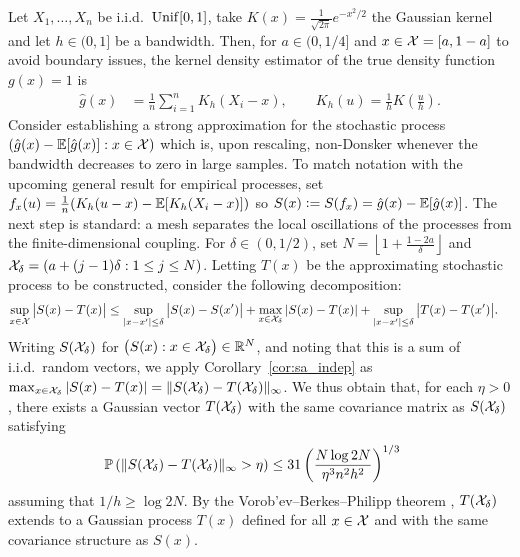 Let $X_1, \ldots, X_n$ be i.i.d.\ $\operatorname{Unif}[0,1]$, take
$K(x) = \frac{1}{\sqrt{2 \pi}} e^{-x^2/2}$ the Gaussian kernel and let
$h \in (0,1]$ be a bandwidth. Then, for $a \in (0,1/4]$ and
$x \in \mathcal{X} = [a, 1-a]$ to avoid boundary issues, the kernel density estimator
of the true density function $g(x) = 1$ is
%
\begin{align*}
  \hat g(x)
  &=
  \frac{1}{n}
  \sum_{i=1}^{n}
  K_h( X_i - x),
  \qquad K_h(u) = \frac{1}{h} K\left( \frac{u}{h} \right).
\end{align*}
%
Consider establishing a strong approximation for the stochastic process
$(\hat g(x)-\mathbb{E} [ \hat g(x) ] : x\in\mathcal{X})$
which is, upon rescaling, non-Donsker whenever
the bandwidth decreases to zero in large samples.
To match notation with the upcoming
general result for empirical processes, set
$f_x(u) = \frac{1}{n} (K_h( u - x) - \mathbb{E}[K_h( X_i - x)])$
so $S(x) \vcentcolon= S(f_x) = \hat g(x)-\mathbb{E} [ \hat g(x) ]$.
The next step is standard: a
mesh separates the local oscillations of the processes from
the finite-dimensional coupling. %
For $\delta \in (0,1/2)$, set
$N = \left\lfloor 1 + \frac{1 - 2a}{\delta} \right\rfloor$
and $\mathcal{X}_\delta = (a + (j-1)\delta : 1 \leq j \leq N)$.
Letting $T(x)$ be the approximating stochastic
process to be constructed, consider the following decomposition:
\begin{align*}
  \sup_{x \in \mathcal{X}}
  \big|S(x) - T(x)\big|
  &\leq
  \sup_{|x-x'| \leq \delta}
  \big|S(x) - S(x') \big|
  + \max_{x \in \mathcal{X}_\delta}
  |S(x) - T(x)|
  + \sup_{|x-x'| \leq \delta}
  \big|T(x) - T(x')\big|.
\end{align*}
%
Writing $S(\mathcal{X}_\delta)$ for
$\big(S(x) : x \in \mathcal{X}_\delta\big)\in \mathbb{R}^N$,
and noting that this is a sum of i.i.d.\ random vectors, we apply
Corollary~\ref{cor:sa_indep} as
$\max_{x \in \mathcal{X}_\delta} |S(x) - T(x)|
= \| S(\mathcal{X}_\delta) - T(\mathcal{X}_\delta) \|_\infty$.
We thus obtain that, for each
$\eta > 0$, there exists a Gaussian vector
$T(\mathcal{X}_\delta)$ with the same covariance matrix as $S(\mathcal{X}_\delta)$
satisfying
%
\begin{align*}
  \mathbb{P}\left(
    \|S(\mathcal{X}_\delta) - T(\mathcal{X}_\delta)\|_\infty > \eta
  \right)
  &\leq
  31 \left(
    \frac{N \log 2 N}{\eta^3 n^2 h^2}
  \right)^{1/3}
\end{align*}
%
assuming that $1/h \geq \log 2 N$.
By the Vorob'ev--Berkes--Philipp theorem
\citep[Theorem~1.1.10]{dudley1999uniform},
$T(\mathcal{X}_\delta)$ extends to a Gaussian process $T(x)$
defined for all $x \in \mathcal{X}$ and with the same covariance structure
as $S(x)$.

